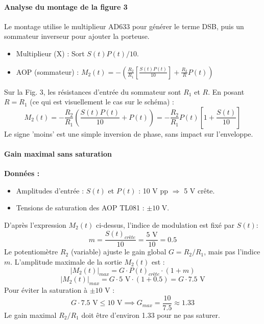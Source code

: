 \documentclass[11pt,a4paper]{article}
\begin{document}
\paragraph{Analyse du montage de la figure 3}
Le montage utilise le multiplieur AD633 pour générer le terme DSB, puis un sommateur inverseur pour ajouter la porteuse.
\begin{itemize}
    \item Multiplieur (X) : Sort $S(t)P(t)/10$.
    \item AOP (sommateur) : $M_2(t) = - \left( \frac{R_2}{R_1} \left[ \frac{S(t)P(t)}{10} \right] + \frac{R_2}{R} P(t) \right)$
\end{itemize}
Sur la Fig. 3, les résistances d'entrée du sommateur sont $R_1$ et $R$.
En posant $R = R_1$ (ce qui est visuellement le cas sur le schéma) :
\begin{equation}
M_2(t) = -\frac{R_2}{R_1} \left( \frac{S(t)P(t)}{10} + P(t) \right) = -\frac{R_2}{R_1} P(t) \left[ 1 + \frac{S(t)}{10} \right]
\end{equation}
Le signe 'moins' est une simple inversion de phase, sans impact sur l'enveloppe.

\paragraph{Gain maximal sans saturation}
\textbf{Données :}
\begin{itemize}
    \item Amplitudes d'entrée : $S(t)$ et $P(t)$ : 10 V pp $\Rightarrow$ 5 V crête.
    \item Tensions de saturation des AOP TL081 : $\pm 10$ V.
\end{itemize}
D'après l'expression $M_2(t)$ ci-dessus, l'indice de modulation est fixé par $S(t)$:
\begin{equation}
m = \frac{S(t)_{crête}}{10} = \frac{5 \text{ V}}{10} = 0.5
\end{equation}
Le potentiomètre $R_2$ (variable) ajuste le gain global $G = R_2/R_1$, mais pas l'indice $m$.
L'amplitude maximale de la sortie $M_2(t)$ est :
\begin{equation}
|M_2(t)|_{max} = G \cdot P(t)_{crête} \cdot (1 + m)
\end{equation}
\begin{equation}
|M_2(t)|_{max} = G \cdot 5 \text{ V} \cdot (1 + 0.5) = G \cdot 7.5 \text{ V}
\end{equation}
Pour éviter la saturation à $\pm 10$ V :
\begin{equation}
G \cdot 7.5 \text{ V} \leq 10 \text{ V} \implies \boxed{G_{max} = \frac{10}{7.5} \approx 1.33}
\end{equation}
Le gain maximal $R_2/R_1$ doit être d'environ 1.33 pour ne pas saturer.
\end{document}
